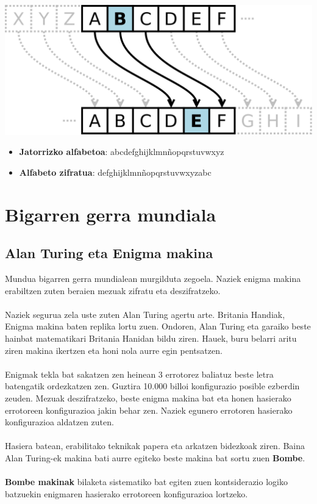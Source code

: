 \documentclass[12pt]{basque-book}
\begin{document}
\includegraphics[scale=0.1]{Zesar_zifratu.png}

\begin{itemize}
    \item \textbf{Jatorrizko alfabetoa}: abcdefghijklmnñopqrstuvwxyz
    \item \textbf{Alfabeto zifratua}: defghijklmnñopqrstuvwxyzabc
\end{itemize}

\section{Bigarren gerra mundiala}

\subsection{Alan Turing eta Enigma makina}
Mundua bigarren gerra mundialean murgilduta zegoela. Naziek enigma makina erabiltzen zuten beraien mezuak zifratu eta deszifratzeko.
\\\\
Naziek segurua zela uste zuten Alan Turing agertu arte. Britania Handiak, Enigma makina baten replika lortu zuen. Ondoren, Alan Turing eta garaiko beste hainbat matematikari Britania Hanidan bildu ziren. Hauek, buru belarri aritu ziren makina ikertzen eta honi nola aurre egin pentsatzen.
\\\\
Enigmak tekla bat sakatzen zen heinean 3 errotorez baliatuz beste letra batengatik ordezkatzen zen. Guztira 10.000 billoi konfigurazio posible ezberdin zeuden. Mezuak deszifratzeko, beste enigma makina bat eta honen hasierako errotoreen konfigurazioa jakin behar zen. Naziek egunero errotoren hasierako konfigurazioa aldatzen zuten.
\\\\
Hasiera batean, erabilitako teknikak papera eta arkatzen bidezkoak ziren. Baina Alan Turing-ek makina bati aurre egiteko beste makina bat sortu zuen \textbf{Bombe}.
\\\\
\textbf{Bombe makinak} bilaketa sistematiko bat egiten zuen kontsiderazio logiko batzuekin enigmaren hasierako errotoreen konfigurazioa lortzeko.
\end{document}
